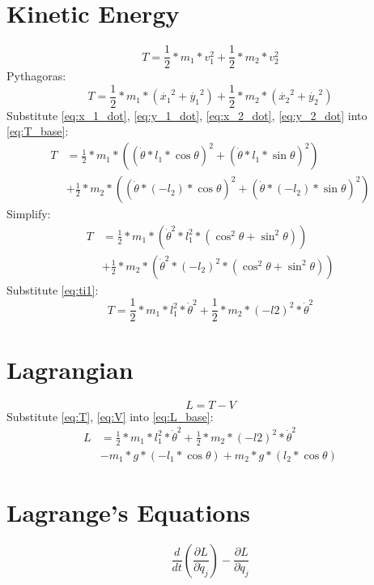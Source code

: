 \documentclass[titlepage]{article}
\numberwithin{equation}{section}
\begin{document}
\section{Kinetic Energy}
\begin{equation}
T = \frac{1}{2} * m_1 * v_1^2 + \frac{1}{2} * m_2 * v_2^2
\end{equation}
Pythagoras:
\begin{equation} \label{eq:T_base}
T = \frac{1}{2} * m_1 * (\dot{x_1}^2 + \dot{y_1}^2) + \frac{1}{2} * m_2 * (\dot{x_2}^2 + \dot{y_2}^2)
\end{equation}
Substitute \ref{eq:x_1_dot}, \ref{eq:y_1_dot}, \ref{eq:x_2_dot}, \ref{eq:y_2_dot} into \ref{eq:T_base}:
\begin{align}
T &= \frac{1}{2} * m_1 * ((\dot{\theta} * l_1 * \cos \theta)^2 + (\dot{\theta} * l_1 * \sin \theta)^2) \nonumber \\
  &+ \frac{1}{2} * m_2 * ((\dot{\theta} * (-l_2) * \cos \theta)^2 + (\dot{\theta} * (-l_2) * \sin \theta)^2)
\end{align}
Simplify:
\begin{align}
T &= \frac{1}{2} * m_1 * (\dot{\theta}^2 * l_1^2 * (\cos^2 \theta + \sin^2 \theta)) \nonumber \\
  &+ \frac{1}{2} * m_2 * (\dot{\theta}^2 * (-l_2)^2 * (\cos^2 \theta + \sin^2 \theta))
\end{align}
Substitute \ref{eq:ti1}:
\begin{equation} \label{eq:T}
T = \frac{1}{2} * m_1 * l_1^2 * \dot{\theta}^2 + \frac{1}{2} * m_2 * (-l2)^2 * \dot{\theta}^2
\end{equation}

\section{Lagrangian}
\begin{equation} \label{eq:L_base}
L = T - V
\end{equation}
Substitute \ref{eq:T}, \ref{eq:V} into \ref{eq:L_base}:
\begin{align}
L &= \frac{1}{2} * m_1 * l_1^2 * \dot{\theta}^2 + \frac{1}{2} * m_2 * (-l2)^2 * \dot{\theta}^2 \nonumber \\
  &- m_1 * g * (-l_1 * \cos \theta) + m_2 * g * (l_2 * \cos \theta)
\end{align}

\section{Lagrange's Equations}
\begin{equation} \label{eq:LE_base}
\frac{d}{dt} \left(\frac{\partial L}{\partial \dot{q}_j}\right) - \frac{\partial L}{\partial q_j}
\end{equation}
\end{document}

